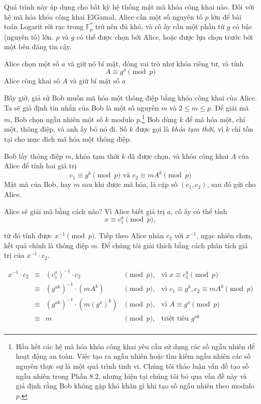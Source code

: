 Quá trình này áp dụng cho bất kỳ hệ thống mật mã khóa công khai nào. Đối với hệ mã hóa khóa công khai ElGamal, Alice cần một số nguyên tố $p$ lớn để bài toán Logarit rời rạc trong $\mathbb{F}^*_p$ trờ nên đủ khó,
và cô ấy cần một phần từ $g$ có bậc (nguyên tố) lớn.  $p$ và $g$ có thể được chọn bởi Alice, hoặc được lựa chọn trước bởi một bên đáng tin cậy.

Alice chọn một số $a$ và giữ nó bí mật, đóng vai trò như khóa riêng tư, và tính
$$A \equiv g^a \pmod{p}$$
Alice công khai số $A$ và giữ bí mật số $a$

Bây giờ, giả sử Bob muốn mã hóa một thông điệp bằng khóa công khai của Alice. Ta sẽ giả định tin nhắn của Bob là một số nguyên $m$ và $2\leq m \leq p$.
Để giải mã $m$, Bob chọn ngẫu nhiên một số $k$ modulo $p$.\footnote{Hầu hết các hệ mã hóa khóa công khai yêu cầu sử dụng các số ngẫu nhiên
	để hoạt động an toàn. Việc tạo ra ngẫu nhiên hoặc tìm kiếm ngẫu nhiên các số nguyên thực sự là một quá trình tinh vi.
	Chúng tôi thảo luận vấn đề tạo số ngẫu nhiên trong Phần 8.2, nhưng hiện tại chúng tôi bỏ qua vấn đề này và giả định rằng
	Bob không gặp khó khăn gì khi tạo số ngẫu nhiên theo modulo $p$.} Bob dùng $k$ để mã hóa một, chỉ một, thông điệp, và anh ấy bỏ nó đi.
Số  $k$ được gọi là \textit{khóa tạm thời}, vì $k$ chỉ tồn tại cho mục đích mã hóa một thông điệp.

Bob lấy thông điệp $m$, khóa tạm thời $k$ đã được chọn, và khóa công khai $A$ của Alice để tính hai giá trị
$$  c_1 \equiv g^k \pmod{p} \text{ và } c_2 \equiv mA^k \pmod{p}$$
Mật mã của Bob, hay $m$ sau khi được mã hóa, là cặp số $(c_1, c_2)$, sau đó gửi cho Alice.

Alice sẽ giải mã bằng cách nào? Vì Alice biết giá trị $a$, cô ấy có thể tính
$$ x \equiv c_1^a \pmod{p},$$

từ đó tính được $x^{-1} \pmod{p}$. Tiếp theo Alice nhân $c_2$ với $x^{-1}$, ngạc nhiên chưa, kết quả chính là thông điệp $m$.
Để chúng tôi giải thích bằng cách phân tích giá trị của $x^{-1} \cdot c_2$.

$$
	\begin{array}{rclcl}
		x^{-1} \cdot c_2 & \equiv & (c_1^a)^{-1} \cdot c_2         & \pmod{p}, & \text{vì } x \equiv c_1^a \pmod{p}                  \\
		                 & \equiv & (g^{ak})^{-1} \cdot (mA^k)     & \pmod{p}, & \text{vì } c_1 \equiv g^k, c_2 \equiv mA^k \pmod{p} \\
		                 & \equiv & (g^{ak})^{-1} \cdot (m(g^a)^k) & \pmod{p}, & \text{vì } A \equiv g^a \pmod{p}                    \\
		                 & \equiv & m                              & \pmod{p}, & \text{triệt tiêu }  g^{ak}                          \\
	\end{array}
$$

